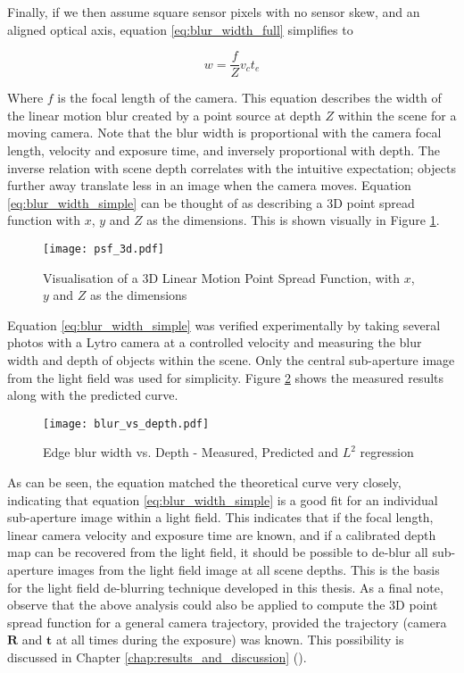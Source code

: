 Finally, if we then assume square sensor pixels with no sensor skew, and an aligned optical axis, equation \ref{eq:blur_width_full} simplifies to

\begin{equation}
\label{eq:blur_width_simple}
w = \frac{f}{Z} v_c t_e
\end{equation}

Where $f$ is the focal length of the camera.
This equation describes the width of the linear motion blur created by a point source at depth $Z$ within the scene for a moving camera.
Note that the blur width is proportional with the camera focal length, velocity and exposure time, and inversely proportional with depth.
The inverse relation with scene depth correlates with the intuitive expectation; objects further away translate less in an image when the camera moves.
Equation \ref{eq:blur_width_simple} can be thought of as describing a 3D point spread function with $x$, $y$ and $Z$ as the dimensions.
This is shown visually in Figure \ref{fig:psf_3d}.


\begin{figure}[h]

\centering
\texttt{[image: psf\_3d.pdf]}
\caption[Visualisation of a 3D Point Spread Function]{Visualisation of a 3D Linear Motion Point Spread Function, with $x$, $y$ and $Z$ as the dimensions}
\label{fig:psf_3d}
\end{figure}

Equation \ref{eq:blur_width_simple} was verified experimentally by taking several photos with a Lytro camera at a controlled velocity and measuring the blur width and depth of objects within the scene.
Only the central sub-aperture image from the light field was used for simplicity.
Figure \ref{fig:blur_vs_width} shows the measured results along with the predicted curve.

\begin{figure}[h]
\centering
\caption[Edge blur width vs. Depth]{Edge blur width vs. Depth - Measured, Predicted and $L^{2}$ regression}
\label{fig:blur_vs_width}
\texttt{[image: blur\_vs\_depth.pdf]}
\end{figure}

As can be seen, the equation matched the theoretical curve very closely, indicating that equation \ref{eq:blur_width_simple} is a good fit for an individual sub-aperture image within a light field.
This indicates that if the focal length, linear camera velocity and exposure time are known, and if a calibrated depth map can be recovered from the light field, it should be possible to de-blur all sub-aperture images from the light field image at all scene depths.
This is the basis for the light field de-blurring technique developed in this thesis.
As a final note, observe that the above analysis could also be applied to compute the 3D point spread function for a general camera trajectory, provided the trajectory (camera $\boldsymbol{R}$ and $\boldsymbol{t}$ at all times during the exposure) was known.
This possibility is discussed in Chapter \ref{chap:results_and_discussion} ().


